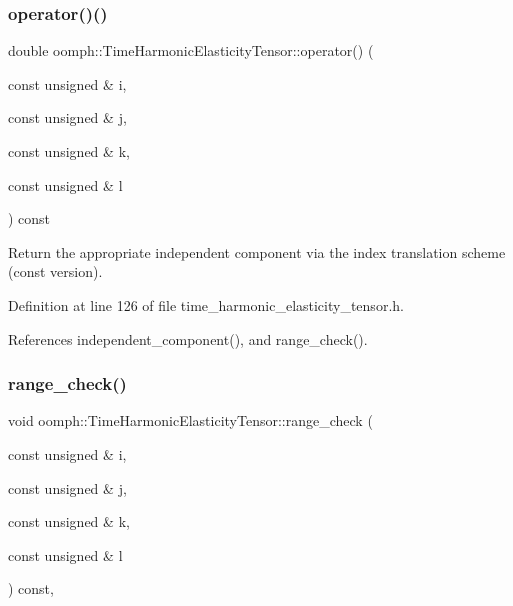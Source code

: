 \subsubsection{\texorpdfstring{operator()()}{operator()()}}
{\footnotesize\ttfamily double oomph\+::\+Time\+Harmonic\+Elasticity\+Tensor\+::operator() (\begin{DoxyParamCaption}\item[{const unsigned \&}]{i,  }\item[{const unsigned \&}]{j,  }\item[{const unsigned \&}]{k,  }\item[{const unsigned \&}]{l }\end{DoxyParamCaption}) const\hspace{0.3cm}{\ttfamily [inline]}}



Return the appropriate independent component via the index translation scheme (const version). 



Definition at line 126 of file time\+\_\+harmonic\+\_\+elasticity\+\_\+tensor.\+h.



References independent\+\_\+component(), and range\+\_\+check().

\mbox{\label{classoomph_1_1TimeHarmonicElasticityTensor_a825792d8631abc2a23ed5f12c445384c}} 
\subsubsection{\texorpdfstring{range\+\_\+check()}{range\_check()}}
{\footnotesize\ttfamily void oomph\+::\+Time\+Harmonic\+Elasticity\+Tensor\+::range\+\_\+check (\begin{DoxyParamCaption}\item[{const unsigned \&}]{i,  }\item[{const unsigned \&}]{j,  }\item[{const unsigned \&}]{k,  }\item[{const unsigned \&}]{l }\end{DoxyParamCaption}) const\hspace{0.3cm}{\ttfamily [inline]}, {\ttfamily [protected]}}



